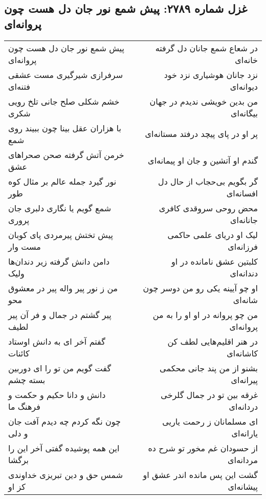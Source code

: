 \begin{center}
\section*{غزل شماره ۲۷۸۹: پیش شمع نور جان دل هست چون پروانه‌ای}
\label{sec:2789}
\begin{longtable}{l p{0.5cm} r}
پیش شمع نور جان دل هست چون پروانه‌ای
&&
در شعاع شمع جانان دل گرفته خانه‌ای
\\
سرفرازی شیرگیری مست عشقی فتنه‌ای
&&
نزد جانان هوشیاری نزد خود دیوانه‌ای
\\
خشم شکلی صلح جانی تلخ رویی شکری
&&
من بدین خویشی ندیدم در جهان بیگانه‌ای
\\
با هزاران عقل بینا چون ببیند روی شمع
&&
پر او در پای پیچد درفتد مستانه‌ای
\\
خرمن آتش گرفته صحن صحراهای عشق
&&
گندم او آتشین و جان او پیمانه‌ای
\\
نور گیرد جمله عالم بر مثال کوه طور
&&
گر بگویم بی‌حجاب از حال دل افسانه‌ای
\\
شمع گویم یا نگاری دلبری جان پروری
&&
محض روحی سروقدی کافری جانانه‌ای
\\
پیش تختش پیرمردی پای کوبان مست وار
&&
لیک او دریای علمی حاکمی فرزانه‌ای
\\
دامن دانش گرفته زیر دندان‌ها ولیک
&&
کلبتین عشق نامانده در او دندانه‌ای
\\
من ز نور پیر واله پیر در معشوق محو
&&
او چو آیینه یکی رو من دوسر چون شانه‌ای
\\
پیر گشتم در جمال و فر آن پیر لطیف
&&
من چو پروانه در او او را به من پروانه‌ای
\\
گفتم آخر ای به دانش اوستاد کائنات
&&
در هنر اقلیم‌هایی لطف کن کاشانه‌ای
\\
گفت گویم من تو را ای دوربین بسته چشم
&&
بشنو از من پند جانی محکمی پیرانه‌ای
\\
دانش و دانا حکیم و حکمت و فرهنگ ما
&&
غرقه بین تو در جمال گلرخی دردانه‌ای
\\
چون نگه کردم چه دیدم آفت جان و دلی
&&
ای مسلمانان ز رحمت یاریی یارانه‌ای
\\
این همه پوشیده گفتی آخر این را برگشا
&&
از حسودان غم مخور تو شرح ده مردانه‌ای
\\
شمس حق و دین تبریزی خداوندی کز او
&&
گشت این پس مانده اندر عشق او پیشانه‌ای
\\
\end{longtable}
\end{center}

